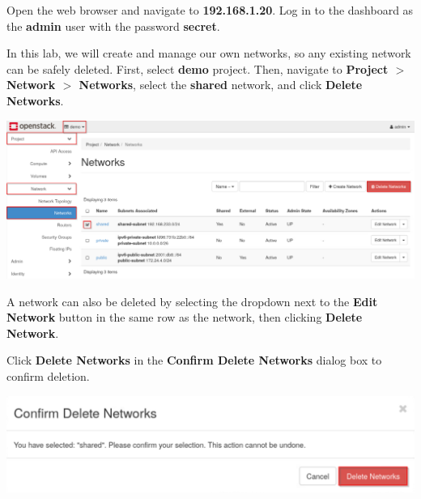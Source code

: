 \documentclass[letterpaper, 12pt]{article}
\begin{document}
\begin{enumerate}
    \begin{labstep}
        Open the web browser and navigate to \textbf{192.168.1.20}.
        Log in to the dashboard as the \textbf{admin} user with the password \textbf{secret}.
    \end{labstep}

    \begin{labstep}
        In this lab, we will create and manage our own networks, so any existing network can be safely deleted.
        First, select \textbf{demo} project.
        Then, navigate to \textbf{Project $>$ Network $>$ Networks}, select the \textbf{shared} network, and click \textbf{Delete Networks}.

        \begin{center}
            \includegraphics[width=\linewidth]{images/part3/step2.png}
        \end{center}
    \end{labstep}

    \begin{tipbox}
        A network can also be deleted by selecting the dropdown next to the \textbf{Edit Network} button in the same row as the network, then clicking \textbf{Delete Network}.
    \end{tipbox}

    \begin{labstep}
        Click \textbf{Delete Networks} in the \textbf{Confirm Delete Networks} dialog box to confirm deletion.

        \begin{center}
            \includegraphics[width=\linewidth]{images/part3/step3.png}
        \end{center}
    \end{labstep}


\end{enumerate}
\end{document}
